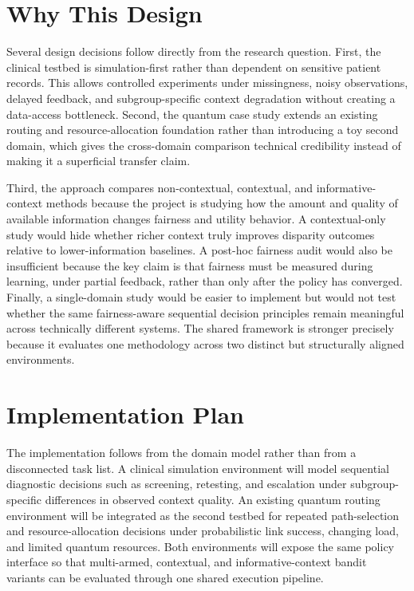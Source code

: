\documentclass{IEEEtran}
\begin{document}
\section{Why This Design}
Several design decisions follow directly from the research question. First, the clinical testbed is simulation-first rather than dependent on sensitive patient records. This allows controlled experiments under missingness, noisy observations, delayed feedback, and subgroup-specific context degradation without creating a data-access bottleneck. Second, the quantum case study extends an existing routing and resource-allocation foundation rather than introducing a toy second domain, which gives the cross-domain comparison technical credibility instead of making it a superficial transfer claim.

Third, the approach compares non-contextual, contextual, and informative-context methods because the project is studying how the amount and quality of available information changes fairness and utility behavior. A contextual-only study would hide whether richer context truly improves disparity outcomes relative to lower-information baselines. A post-hoc fairness audit would also be insufficient because the key claim is that fairness must be measured during learning, under partial feedback, rather than only after the policy has converged. Finally, a single-domain study would be easier to implement but would not test whether the same fairness-aware sequential decision principles remain meaningful across technically different systems. The shared framework is stronger precisely because it evaluates one methodology across two distinct but structurally aligned environments.

\section{Implementation Plan}
The implementation follows from the domain model rather than from a disconnected task list. A clinical simulation environment will model sequential diagnostic decisions such as screening, retesting, and escalation under subgroup-specific differences in observed context quality. An existing quantum routing environment will be integrated as the second testbed for repeated path-selection and resource-allocation decisions under probabilistic link success, changing load, and limited quantum resources. Both environments will expose the same policy interface so that multi-armed, contextual, and informative-context bandit variants can be evaluated through one shared execution pipeline.
\end{document}
